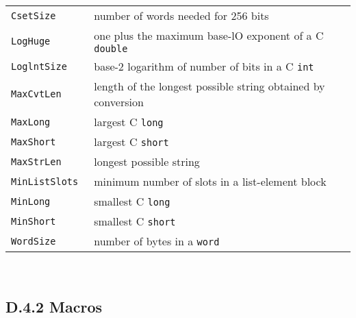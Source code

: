 {\renewcommand{\arraystretch}{0.9}%
\begin{tabular}{>{\hspace{1cm}\texttt\bgroup}l<{\egroup}@{\hspace{1cm}}p{11cm}}
CsetSize     & number of words needed for 256 bits\\
LogHuge      & one plus the maximum base-lO exponent of a C \texttt{double}\\
LoglntSize   & base-2 logarithm of number of bits in a C \texttt{int}\\
MaxCvtLen    & length of the longest possible string obtained by conversion\\
MaxLong      & largest C \texttt{long}\\
MaxShort     & largest C \texttt{short}\\
MaxStrLen    & longest possible string\\
MinListSlots & minimum number of slots in a list-element block\\
MinLong      & smallest C \texttt{long}\\
MinShort     & smallest C \texttt{short}\\
WordSize     & number of bytes in a \texttt{word}\\
\end{tabular}
}\\[1ex]

\subsection[D.4.2 Macros]{D.4.2 Macros}

